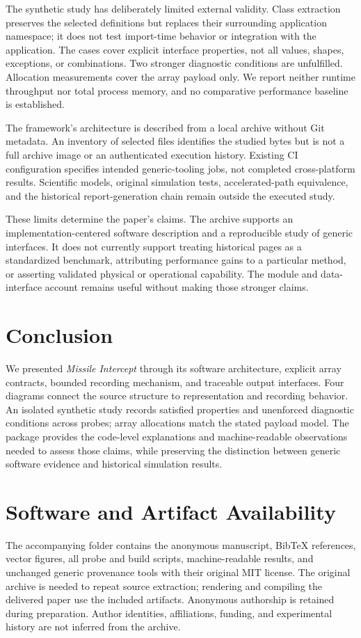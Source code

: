 \documentclass[11pt,a4paper]{article}
\begin{document}
The synthetic study has deliberately limited external validity. Class extraction preserves the selected definitions but replaces their surrounding application namespace; it does not test import-time behavior or integration with the application. The cases cover explicit interface properties, not all values, shapes, exceptions, or combinations. Two stronger diagnostic conditions are unfulfilled. Allocation measurements cover the array payload only. We report neither runtime throughput nor total process memory, and no comparative performance baseline is established.

The framework's architecture is described from a local archive without Git metadata. An inventory of \SelectedFiles selected files identifies the studied bytes but is not a full archive image or an authenticated execution history. Existing CI configuration specifies intended generic-tooling jobs, not completed cross-platform results. Scientific models, original simulation tests, accelerated-path equivalence, and the historical report-generation chain remain outside the executed study.

These limits determine the paper's claims. The archive supports an implementation-centered software description and a reproducible study of generic interfaces. It does not currently support treating historical pages as a standardized benchmark, attributing performance gains to a particular method, or asserting validated physical or operational capability. The module and data-interface account remains useful without making those stronger claims.

\section{Conclusion}
We presented \emph{Missile Intercept} through its software architecture, explicit array contracts, bounded recording mechanism, and traceable output interfaces. Four diagrams connect the source structure to representation and recording behavior. An isolated synthetic study records \SoftwareRequirementsMet satisfied properties and \SoftwareLimitations unenforced diagnostic conditions across \SoftwareProbeCount probes; \AllocationCases array allocations match the stated payload model. The package provides the code-level explanations and machine-readable observations needed to assess those claims, while preserving the distinction between generic software evidence and historical simulation results.

\section*{Software and Artifact Availability}
The accompanying folder contains the anonymous manuscript, BibTeX references, vector figures, all probe and build scripts, machine-readable results, and unchanged generic provenance tools with their original MIT license. The original archive is needed to repeat source extraction; rendering and compiling the delivered paper use the included artifacts. Anonymous authorship is retained during preparation. Author identities, affiliations, funding, and experimental history are not inferred from the archive.
\end{document}
